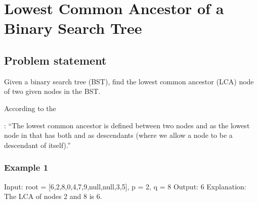 \documentclass[letterpaper,12pt,english]{book}
\begin{document}
\sphinxstepscope


\section{Lowest Common Ancestor of a Binary Search Tree}
\label{\detokenize{Binary_Tree/235_Lowest_Common_Ancestor_of_a_Binary_Search_Tree:lowest-common-ancestor-of-a-binary-search-tree}}\label{\detokenize{Binary_Tree/235_Lowest_Common_Ancestor_of_a_Binary_Search_Tree::doc}}

\subsection{Problem statement\sphinxfootnotemark[67]}
\label{\detokenize{Binary_Tree/235_Lowest_Common_Ancestor_of_a_Binary_Search_Tree:problem-statement}}%
\begin{footnotetext}[67]\sphinxAtStartFootnote
{}
%
\end{footnotetext}\ignorespaces 
\sphinxAtStartPar
Given a binary search tree (BST), find the lowest common ancestor (LCA) node of two given nodes in the BST.

\sphinxAtStartPar
According to the %
\begin{footnote}[68]\sphinxAtStartFootnote
{}
%
\end{footnote}: “The lowest common ancestor is defined between two nodes  and  as the lowest node in  that has both  and  as descendants (where we allow a node to be a descendant of itself).”


\subsubsection{Example 1}
\label{\detokenize{Binary_Tree/235_Lowest_Common_Ancestor_of_a_Binary_Search_Tree:example-1}}
\sphinxAtStartPar
{}

\begin{sphinxVerbatim}[commandchars=\\\{\}]
Input: root = [6,2,8,0,4,7,9,null,null,3,5], p = 2, q = 8
Output: 6
Explanation: The LCA of nodes 2 and 8 is 6.
\end{sphinxVerbatim}
\end{document}
